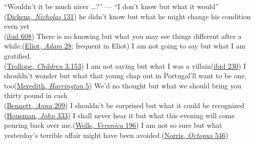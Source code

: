 \ea \label{ex:12-76}
\ea
``Wouldn't it be much nicer {\dots}?'' --- ``I don't know but what it would''\\\hfill(\href{https://archive.org/details/lifeadventuresofdickrich/page/144/mode/2up?q=%22know+but+what+it+would%22&view=theater}{Dickens, \textit{Nicholas} 131})
\ex 
he didn't know but what he might change his condition even yet\\\hfill(\href{https://archive.org/details/lifeadventuresofdickrich/page/638/mode/2up?q=%22but+what%22&view=theater}{ibid 608}) %
\ex
There is no knowing but what you may see things different after a while.\hfill(\href{https://archive.org/details/adambede00eliouoft/page/n35/mode/2up?q=%22knowing+but+what%22&view=theater}{Eliot, \textit{Adam} 28}; frequent in Eliot) %
\ex
I am not going to say but what I am gratified.\\\hfill(\href{https://archive.org/details/dukeschildrennov00troluoft/page/390/mode/2up?q=%22but+what+I+am+gratified%22&view=theater}{Trollope, \textit{Children} 3.153}) 
\ex
I am not saying but what I was a villain\hfill(\href{https://archive.org/details/dukeschildrennov00troluoft/page/432/mode/2up?q=%22but+what%22&view=theater}{ibid 230}) %
\ex
I shouldn't wonder but what that young chap out in Portugal'll want to be one, too\hfill(\href{https://archive.org/details/evanharringtonno00mererich/page/4/mode/2up?q=%22wonder+but+what%22&view=theater}{Meredith, \textit{Harrington} 5}) %
\ex
We'd no thought but what we should bring you thirty pound in cash\\\hfill(\href{https://archive.org/details/annaoffivetownsn00benniala/annaoffivetownsn00benniala/page/242/mode/2up?q=%22thought+but+what%22&view=theater}{Bennett, \textit{Anna} 209}) %
\ex
I shouldn't be surprised but what it could be recognized\\\hfill(\href{https://www.gutenberg.org/cache/epub/18498/pg18498-images.html#CHAPTER_XXI}{Housman, \textit{John} 333})
\ex
I shall never hear it but what this evening will come pouring back over me.\hfill(\href{https://archive.org/details/annveronicamoder0000hgwe/page/206/mode/2up?q=%22i+shall+never+hear+it%22&view=theater}{Wells, \textit{Veronica} 196})
\ex
I am not so sure but what yesterday's terrible affair might have been avoided.\hfill(\href{https://archive.org/details/octopusstoryofca00norruoft/page/546/mode/2up?view=theater&q=%22am+not+so+sure+but+what%22}{Norris, \textit{Octopus} 546})
\z
\z

